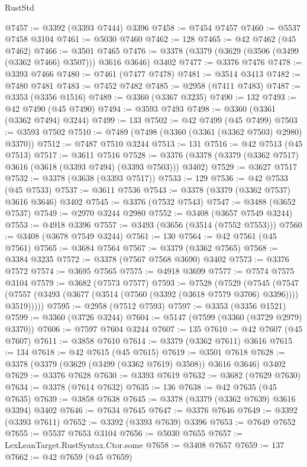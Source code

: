 \begin{lexlean}{RustStd}
\begin{coremodule}
@7457 := @3392 (@3393 @7444) @3396
@7458 := @7454 @7457
@7460 := @5537 @7458 @3104
@7461 := @5030 @7460
@7462 := 128
@7465 := @42 @7462 (@45 @7462)
@7466 := @3501 @7465
@7476 := @3378 (@3379 (@3629 (@3506 (@3499 (@3362 @7466) @3507))) @3616 @3646) @3402
@7477 := @3376 @7476
@7478 := @3393 @7466
@7480 := @7461 (@7477 @7478)
@7481 := @3514 @3413
@7482 := @7480 @7481
@7483 := @7452 @7482
@7485 := @2958 (@7411 @7483)
@7487 := @3353 (@3356 @1516)
@7489 := @3360 (@3367 @3235)
@7490 := 132
@7493 := @42 @7490 (@45 @7490)
@7494 := @3593 @7493
@7498 := @3360 (@3361 (@3362 @7494) @3244)
@7499 := 133
@7502 := @42 @7499 (@45 @7499)
@7503 := @3593 @7502
@7510 := @7489 (@7498 (@3360 (@3361 (@3362 @7503) @2980) @3370))
@7512 := @7487 @7510 @3244
@7513 := 131
@7516 := @42 @7513 (@45 @7513)
@7517 := @3611 @7516
@7528 := @3376 (@3378 (@3379 (@3362 @7517) @3616 (@3618 (@3393 @7494) (@3393 @7503))) @3402)
@7529 := @3627 @7517
@7532 := @3378 (@3638 (@3393 @7517))
@7533 := 129
@7536 := @42 @7533 (@45 @7533)
@7537 := @3611 @7536
@7543 := @3378 (@3379 (@3362 @7537) @3616 @3646) @3402
@7545 := @3376 (@7532 @7543)
@7547 := @3488 (@3652 @7537)
@7549 := @2970 @3244 @2980
@7552 := @3408 (@3657 @7549 @3244)
@7553 := @4918 @3396
@7557 := @3493 (@3656 (@3514 (@7552 @7553)))
@7560 := @3408 (@3678 @7549 @3244)
@7561 := 130
@7564 := @42 @7561 (@45 @7561)
@7565 := @3684 @7564
@7567 := @3379 (@3362 @7565)
@7568 := @3384 @3235
@7572 := @3378 (@7567 @7568 @3690) @3402
@7573 := @3376 @7572
@7574 := @3695 @7565
@7575 := @4918 @3699
@7577 := @7574 @7575 @3104
@7579 := @3682 (@7573 @7577)
@7593 := @7528
    (@7529
      (@7545
        (@7547 (@7557 (@3493 (@3677 (@3514 (@7560 (@3392 (@3618 @7579 @3706) @3396)))) @3519)))))
@7595 := @2958 (@7512 @7593)
@7597 := @3353 (@3356 @1521)
@7599 := @3360 (@3726 @3244)
@7604 := @5147 (@7599 (@3360 (@3729 @2979) @3370))
@7606 := @7597 @7604 @3244
@7607 := 135
@7610 := @42 @7607 (@45 @7607)
@7611 := @3858 @7610
@7614 := @3379 (@3362 @7611) @3616
@7615 := 134
@7618 := @42 @7615 (@45 @7615)
@7619 := @3501 @7618
@7628 := @3378 (@3379 (@3629 (@3499 (@3362 @7619) @3508)) @3616 @3646) @3402
@7629 := @3376 @7628
@7630 := @3393 @7619
@7632 := @3682 (@7629 @7630)
@7634 := @3378 (@7614 @7632)
@7635 := 136
@7638 := @42 @7635 (@45 @7635)
@7639 := @3858 @7638
@7645 := @3378 (@3379 (@3362 @7639) @3616 @3394) @3402
@7646 := @7634 @7645
@7647 := @3376 @7646
@7649 := @3392 (@3393 @7611)
@7652 := @3392 (@3393 @7639) @3396
@7653 := @7649 @7652
@7655 := @5537 @7653 @3104
@7656 := @5030 @7655
@7657 := LexLeanTarget.RustSyntax.Ctor.some
@7658 := @3408 @7657
@7659 := 137
@7662 := @42 @7659 (@45 @7659)

\end{coremodule}
\end{lexlean}
